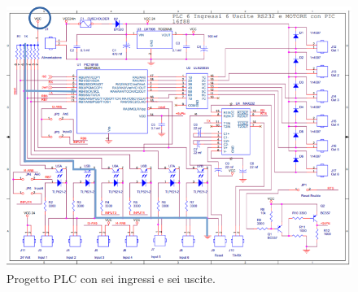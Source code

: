\documentclass[17pt]{extarticle}
\begin{document}
\begin{figure}[b!]		
	\centering
   	\includegraphics[width=5.8in]{PLC6ingressi6uscite.png}%
  	\caption{Progetto PLC con sei ingressi e sei uscite.}
   	\label{fig:PLC6ingressi6uscite}
\end{figure}
\end{document}
